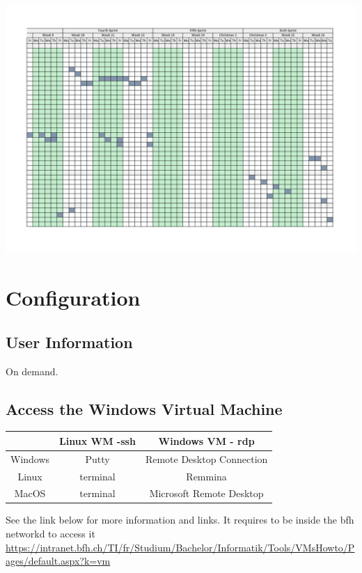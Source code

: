 \documentclass{scrreprt}
\begin{document}
\begin{center}
  \includegraphics[scale = 0.31,  angle=-90]{./Gantt-2}
\end{center}

\chapter{Configuration}

\section{User Information}

On demand.

\section{Access the Windows Virtual Machine}

\begin{center}
  \begin{tabular}{|c|c|c|}
    \hline
     & Linux WM -ssh & Windows VM - rdp \\
    \hline
    Windows & Putty & Remote Desktop Connection \\
    \hline
    Linux & terminal & Remmina \\
    \hline
    MacOS & terminal & Microsoft Remote Desktop \\
    \hline
  \end{tabular}
\end{center}

See the link below for more information and links. It requires to be inside the bfh networkd to access it
\url{https://intranet.bfh.ch/TI/fr/Studium/Bachelor/Informatik/Tools/VMsHowto/Pages/default.aspx?k=vm}
\end{document}
